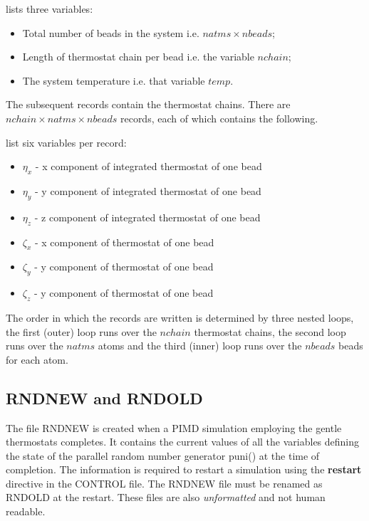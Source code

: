  lists three variables:

\begin{itemize}
  \item Total number of beads in the system i.e. $natms \times nbeads$;
  \item Length of thermostat chain per bead i.e. the variable $nchain$;
  \item The system temperature i.e. that variable $temp$.
\end{itemize}

The subsequent records contain the thermostat chains. There are
$nchain \times natms \times nbeads$ records, each of which contains the following.

 list
six variables per record:

\begin{itemize}
  \item $\eta_{x}$ - x component of integrated thermostat of one bead 
  \item $\eta_{y}$ - y component of integrated thermostat of one bead 
  \item $\eta_{z}$ - z component of integrated thermostat of one bead 
  \item $\zeta_{x}$ - x component of thermostat of one bead
  \item $\zeta_{y}$ - y component of thermostat of one bead
  \item $\zeta_{z}$ - y component of thermostat of one bead
\end{itemize}

The order in which the records are written is determined by three
nested loops, the first (outer) loop runs over the $nchain$ thermostat
chains, the second loop runs over the $natms$ atoms and the third
(inner) loop runs over the $nbeads$ beads for each atom.

\subsection{RNDNEW and RNDOLD}

The file RNDNEW is created when a PIMD simulation employing the gentle
thermostats completes. It contains the current values of all the
variables defining the state of the \DD{} parallel random number
generator {\sc puni()} at the time of completion. The information is
required to restart a simulation using the {\bf restart} directive in
the CONTROL file. The RNDNEW file must be renamed as RNDOLD at the
restart. These files are also {\em unformatted} and not human
readable.

